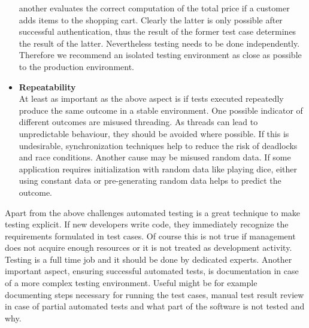 \documentclass[12pt, notitlepage]{article}
\begin{document}
\begin{itemize}
	another evaluates the correct computation of the total price if a customer adds items to the shopping cart.
	Clearly the latter is only possible after successful authentication, thus the result of the former test case determines the result of the latter.
	Nevertheless testing needs to be done independently. Therefore we recommend an isolated testing environment as close as possible to the production environment.
	\item \textbf{Repeatability}\\
	At least as important as the above aspect is if tests executed repeatedly produce the same outcome in a stable environment. One possible 
	indicator of different outcomes are misused threading. As threads can lead to unpredictable behaviour, they should be avoided where possible. 
	If this is undesirable, synchronization techniques help to reduce the risk of deadlocks and race conditions. 
	Another cause may be misused random data. If some application requires initialization with random data like playing dice, either using constant data
	or pre-generating random data helps to predict the outcome. 
\end{itemize}
Apart from the above challenges automated testing is a great technique to make testing explicit. If new developers write code, they immediately recognize 
the requirements formulated in test cases. Of course this is not true if management does not acquire enough resources or it is not treated as development activity.
Testing is a full time job and it should be done by dedicated experts.
Another important aspect, ensuring successful automated tests, is documentation in case of a more complex testing environment. Useful might be for example
documenting steps necessary for running the test cases, manual test result review in case of partial automated tests and what part of the software is not
tested and why. 
\end{document}
